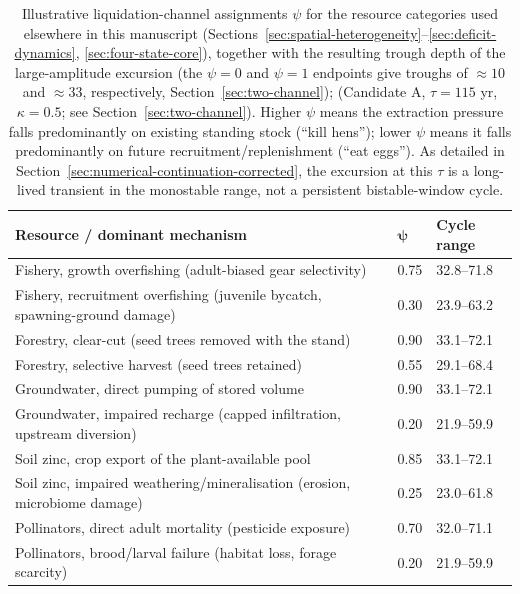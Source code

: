 \documentclass[twocolumn,10pt]{article}
\begin{document}
\begin{table}[h]
\centering
\caption{Illustrative liquidation-channel assignments $\psi$ for the resource categories used elsewhere in this manuscript (Sections~\ref{sec:spatial-heterogeneity}--\ref{sec:deficit-dynamics}, \ref{sec:four-state-core}), together with the resulting trough depth of the large-amplitude excursion (the $\psi=0$ and $\psi=1$ endpoints give troughs of $\approx10$ and $\approx33$, respectively, Section~\ref{sec:two-channel}); (Candidate A, $\tau=115$ yr, $\kappa=0.5$; see Section~\ref{sec:two-channel}). Higher $\psi$ means the extraction pressure falls predominantly on existing standing stock (``kill hens''); lower $\psi$ means it falls predominantly on future recruitment/replenishment (``eat eggs''). As detailed in Section~\ref{sec:numerical-continuation-corrected}, the excursion at this $\tau$ is a long-lived transient in the monostable range, not a persistent bistable-window cycle.}
\label{tab:psi-assignment}
\begin{tabular}{p{3.6cm}p{1.1cm}p{2.5cm}}
\toprule
\textbf{Resource / dominant mechanism} & $\boldsymbol\psi$ & \textbf{Cycle range} \\
\midrule
Fishery, growth overfishing (adult-biased gear selectivity) & 0.75 & 32.8--71.8 \\
Fishery, recruitment overfishing (juvenile bycatch, spawning-ground damage) & 0.30 & 23.9--63.2 \\
Forestry, clear-cut (seed trees removed with the stand) & 0.90 & 33.1--72.1 \\
Forestry, selective harvest (seed trees retained) & 0.55 & 29.1--68.4 \\
Groundwater, direct pumping of stored volume & 0.90 & 33.1--72.1 \\
Groundwater, impaired recharge (capped infiltration, upstream diversion) & 0.20 & 21.9--59.9 \\
Soil zinc, crop export of the plant-available pool & 0.85 & 33.1--72.1 \\
Soil zinc, impaired weathering/mineralisation (erosion, microbiome damage) & 0.25 & 23.0--61.8 \\
Pollinators, direct adult mortality (pesticide exposure) & 0.70 & 32.0--71.1 \\
Pollinators, brood/larval failure (habitat loss, forage scarcity) & 0.20 & 21.9--59.9 \\
\bottomrule
\end{tabular}
\end{table}
\end{document}
